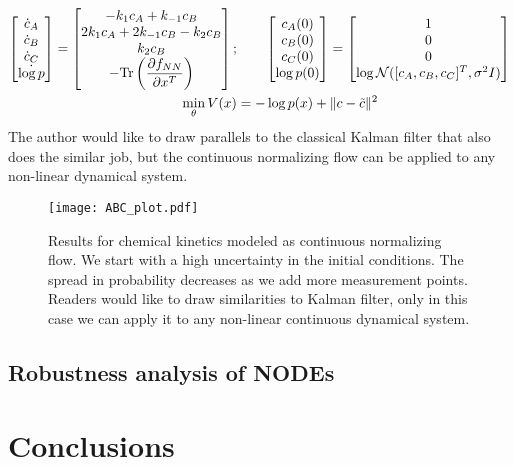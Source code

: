 \documentclass[fontsize=11pt]{article}
\newcommand{\norm}[1]{\lVert #1 \rVert}
\theoremstyle{definition}
\begin{document}
\begin{align}
    \begin{bmatrix} \dot{c}_A \\ \dot{c}_B \\ \dot{c}_C \\ \dot{\log p} \end{bmatrix}
    = \begin{bmatrix}
        -k_{1}c_A + k_{-1}c_B  \\
        2k_{1}c_A +  2k_{-1}c_B - k_2c_B \\
        k_{2}c_B\\
        -\mathrm{Tr} \left(\dfrac{\partial f_{NN}}{\partial x^T}\right)
    \end{bmatrix};
    &\qquad
    \begin{bmatrix} c_A(0) \\ c_B(0) \\ c_C(0) \\ \log p(0) \end{bmatrix} =
    \begin{bmatrix} 1 \\ 0 \\ 0 \\ \log{\mathcal{N}([c_A, c_B, c_C]^T, \sigma^2I)} \end{bmatrix} \notag \\
    \min\limits_{\theta} V(x) &= -\log p(x) + \norm{c - \tilde{c}}^2
\end{align}
The author would like to draw parallels to the classical Kalman filter that also does the similar job,
but the continuous normalizing flow can be applied to any non-linear dynamical system.
\begin{figure}[h]
    \centering
    \texttt{[image: ABC\_plot.pdf]} 
    \caption{Results for chemical kinetics modeled as continuous normalizing
    flow. We start with a high uncertainty in the initial conditions. The spread in 
    probability decreases as we add more measurement points. Readers would like
    to draw similarities to Kalman filter, only in this case we can apply it to 
    any non-linear continuous dynamical system.}
    \label{fig:cnf}
\end{figure}

\subsection{Robustness analysis of NODEs}


\section{Conclusions}


\newpage
\FloatBarrier


\end{document}

